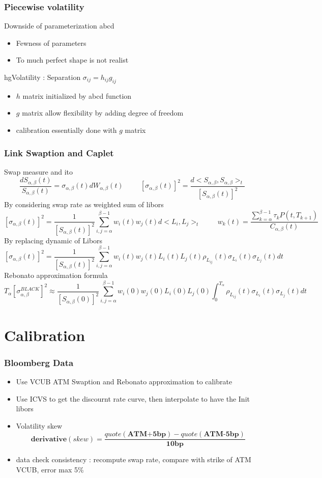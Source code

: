 \documentclass[8pt]{beamer}
\newcommand{\Ta}{T_{\alpha}}
\newcommand{\Sab}{S_{\alpha,\beta}}
\newcommand{\Cab}{C_{\alpha,\beta}}
\newcommand{\Wab}{W_{\alpha,\beta}}
\newcommand{\sigmaab}{\sigma_{\alpha,\beta}}
\begin{document}
\begin{frame}
\frametitle{Piecewise volatility}
Downside of parameterization abcd
\begin{itemize}
\item Fewness of parameters
\item To much perfect shape is not realist
\end{itemize}
hgVolatility : Separation $\sigma_{ij} = h_{ij}g_{ij}$
\begin{itemize}
\item $h$ matrix initialized by abcd function
\item $g$ matrix allow flexibility by adding degree of freedom
\item calibration essentially done with $g$ matrix
\end{itemize} 
\end{frame}

\begin{frame}
\frametitle{Link Swaption and Caplet}
Swap measure and ito
\[
\frac{d\Sab(t)}{\Sab(t)} = \sigmaab(t)d\Wab(t)
\hspace{1cm}
[\sigmaab(t)]^2 = \frac{ d<\Sab,\Sab>_t }{[\Sab(t)]^2 }
\]
By considering swap rate as weighted sum of libors
\[
[\sigmaab(t)]^2 = \frac{1}{[\Sab(t)]^2 } \sum_{i,j=\alpha}^{\beta-1} w_i(t)w_j(t) d<L_i,L_j>_t
\hspace{1cm}
w_k(t) = \frac{\sum^{\beta-1}_{k=\alpha} \tau_k P(t,T_{k+1}) }{\Cab(t)}
\]
By replacing dynamic of Libors
\[
[\sigmaab(t)]^2 = \frac{1}{[\Sab(t)]^2 } \sum_{i,j=\alpha}^{\beta-1} w_i(t)w_j(t) L_i(t)L_j(t) \rho_{L_{ij}}(t) \sigma_{L_i}(t) \sigma_{L_j}(t) dt
\]
Rebonato approximation formula
\[
\Ta[\sigma^{BLACK}_{\alpha,\beta}]^2 \approx \frac{1}{[\Sab(0)]^2 } \sum_{i,j=\alpha}^{\beta-1} w_i(0)w_j(0)L_i(0)L_j(0) 
\int_{0}^{\Ta} \rho_{L_{ij}}(t) \sigma_{L_i}(t) \sigma_{L_j}(t) dt
\]
\end{frame}


\section{Calibration}
\begin{frame}
\frametitle{Bloomberg Data}
\begin{itemize}
\item Use VCUB ATM Swaption and Rebonato approximation to calibrate 
\item Use ICVS to get the discournt rate curve, then interpolate to have the Init libors 
\item Volatility skew
\[
\textbf{derivative}(skew) = \frac{quote (\textbf{ATM+5bp}) - quote(\textbf{ATM-5bp}) }{\textbf{10bp}}
\]
\item data check consistency : recompute swap rate, compare with strike of ATM VCUB, error max 5\%
\end{itemize}
\end{frame}
\end{document}
